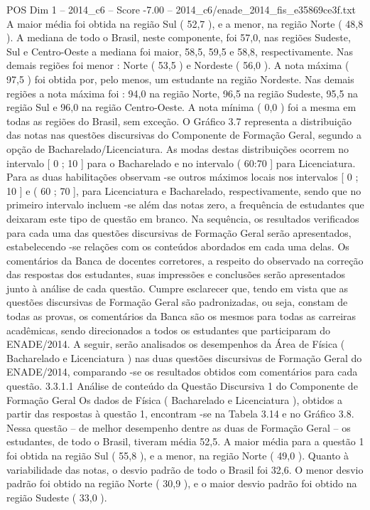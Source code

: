 \begin{textsample}{POS Dim 1 – 2014\_c6 – Score -7.00 – 2014\_c6/enade\_2014\_fis\_e35869ce3f.txt}
A maior média foi obtida na região Sul ( 52,7 ), e a menor, na região Norte ( 48,8 ).
A mediana de todo o Brasil, neste componente, foi 57,0, nas regiões Sudeste, Sul e Centro-Oeste a mediana foi maior, 58,5, 59,5 e 58,8, respectivamente.
Nas demais regiões foi menor : Norte ( 53,5 ) e Nordeste ( 56,0 ).
A nota máxima ( 97,5 ) foi obtida por, pelo menos, um estudante na região Nordeste.
Nas demais regiões a nota máxima foi : 94,0 na região Norte, 96,5 na região Sudeste, 95,5 na região Sul e 96,0 na região Centro-Oeste.
A nota mínima ( 0,0 ) foi a mesma em todas as regiões do Brasil, sem exceção.
O Gráfico 3.7 representa a distribuição das notas nas questões discursivas do Componente de Formação Geral, segundo a opção de Bacharelado/Licenciatura.
As modas destas distribuições ocorrem no intervalo [ 0 ; 10 ] para o Bacharelado e no intervalo ( 60:70 ] para Licenciatura.
Para as duas habilitações observam -se outros máximos locais nos intervalos [ 0 ; 10 ] e ( 60 ; 70 ], para Licenciatura e Bacharelado, respectivamente, sendo que no primeiro intervalo incluem -se além das notas zero, a frequência de estudantes que deixaram este tipo de questão em branco.
Na sequência, os resultados verificados para cada uma das questões discursivas de Formação Geral serão apresentados, estabelecendo -se relações com os conteúdos abordados em cada uma delas.
Os comentários da Banca de docentes corretores, a respeito do observado na correção das respostas dos estudantes, suas impressões e conclusões serão apresentados junto à análise de cada questão.
Cumpre esclarecer que, tendo em vista que as questões discursivas de Formação Geral são padronizadas, ou seja, constam de todas as provas, os comentários da Banca são os mesmos para todas as carreiras acadêmicas, sendo direcionados a todos os estudantes que participaram do ENADE/2014.
A seguir, serão analisados os desempenhos da Área de Física ( Bacharelado e Licenciatura ) nas duas questões discursivas de Formação Geral do ENADE/2014, comparando -se os resultados obtidos com comentários para cada questão. 3.3.1.1 Análise de conteúdo da Questão Discursiva 1 do Componente de Formação Geral Os dados de Física ( Bacharelado e Licenciatura ), obtidos a partir das respostas à questão 1, encontram -se na Tabela 3.14 e no Gráfico 3.8.
Nessa questão – de melhor desempenho dentre as duas de Formação Geral – os estudantes, de todo o Brasil, tiveram média 52,5.
A maior média para a questão 1 foi obtida na região Sul ( 55,8 ), e a menor, na região Norte ( 49,0 ).
Quanto à variabilidade das notas, o desvio padrão de todo o Brasil foi 32,6.
O menor desvio padrão foi obtido na região Norte ( 30,9 ), e o maior desvio padrão foi obtido na região Sudeste ( 33,0 ).

\end{textsample}
